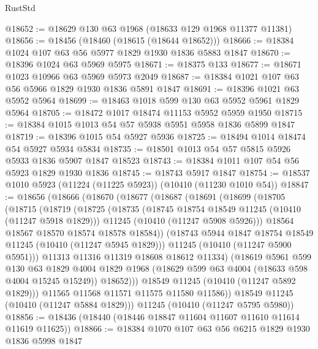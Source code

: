 \begin{lexlean}{RustStd}
\begin{coremodule}
@18652 := @18629 @130 @63 @1968 (@18633 @129 @1968 @11377 @11381)
@18656 := @18456 (@18460 (@18615 (@18644 @18652)))
@18666 := @18384 @1024 @107 @63 @56 @5977 @1829 @1930 @1836 @5883 @1847
@18670 := @18396 @1024 @63 @5969 @5975
@18671 := @18375 @133
@18677 := @18671 @1023 @10966 @63 @5969 @5973 @2049
@18687 := @18384 @1021 @107 @63 @56 @5966 @1829 @1930 @1836 @5891 @1847
@18691 := @18396 @1021 @63 @5952 @5964
@18699 := @18463 @1018 @599 @130 @63 @5952 @5961 @1829 @5964
@18705 := @18472 @1017 @18474 @11153 @5952 @5959 @1950
@18715 := @18384 @1015 @1013 @54 @57 @5938 @5951 @5958 @1836 @5899 @1847
@18719 := @18396 @1015 @54 @5927 @5936
@18725 := @18494 @1014 @18474 @54 @5927 @5934 @5834
@18735 := @18501 @1013 @54 @57 @5815 @5926 @5933 @1836 @5907 @1847 @18523
@18743 := @18384 @1011 @107 @54 @56 @5923 @1829 @1930 @1836
@18745 := @18743 @5917 @1847
@18754 := @18537 @1010 @5923 (@11224 (@11225 @5923)) (@10410 (@11230 @1010 @54))
@18847 := @18656
    (@18666
      (@18670
        (@18677
          (@18687
            (@18691
              (@18699
                (@18705
                  (@18715
                    (@18719
                      (@18725
                        (@18735
                          (@18745 @18754 @18549 @11245 (@10410 (@11247 @5918 @1829)))
                          @11245
                          (@10410 (@11247 @5908 @5926)))
                        @18564
                        @18567
                        @18570
                        @18574
                        @18578
                        @18584))
                    (@18743 @5944 @1847 @18754 @18549 @11245 (@10410 (@11247 @5945 @1829)))
                    @11245
                    (@10410 (@11247 @5900 @5951)))
                  @11313
                  @11316
                  @11319
                  @18608
                  @18612
                  @11334)
                (@18619
                  @5961
                  @599
                  @130
                  @63
                  @1829
                  @4004
                  @1829
                  @1968
                  (@18629 @599 @63 @4004 (@18633 @598 @4004 @15245 @15249))
                  @18652)))
            @18549
            @11245
            (@10410 (@11247 @5892 @1829)))
          @11565
          @11568
          @11571
          @11575
          @11580
          @11586))
      @18549
      @11245
      (@10410 (@11247 @5884 @1829)))
    @11245
    (@10410 (@11247 @5795 @5980))
@18856 := @18436 (@18440 (@18446 @18847 @11604 @11607 @11610 @11614 @11619 @11625))
@18866 := @18384 @1070 @107 @63 @56 @6215 @1829 @1930 @1836 @5998 @1847

\end{coremodule}
\end{lexlean}
